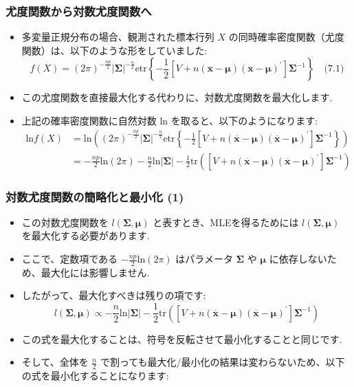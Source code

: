 \documentclass{beamer}
\begin{document}
\begin{frame}
\frametitle{尤度関数から対数尤度関数へ}
\begin{itemize}
    \item 多変量正規分布の場合、観測された標本行列 $X$ の同時確率密度関数（尤度関数）は、以下のような形をしていました:
    \[
    f(X)=(2\pi)^{-\frac{np}{2}}|\bm{\Sigma}|^{-\frac{n}{2}}\text{etr}\left\{-\frac{1}{2}[V+n(\overline{\bm{x}}-\bm{\mu})(\overline{\bm{x}}-\bm{\mu})^{\prime}]\bm{\Sigma}^{-1}\right\} \quad \text{(7.1)} \text{}
    \]
    \item この尤度関数を直接最大化する代わりに、対数尤度関数を最大化します.
    \item 上記の確率密度関数に自然対数 $\text{ln}$ を取ると、以下のようになります:
    \begin{align*}
    \text{ln}f(X)&=\text{ln}\left((2\pi)^{-\frac{np}{2}}|\bm{\Sigma}|^{-\frac{n}{2}}\text{etr}\left\{-\frac{1}{2}[V+n(\overline{\bm{x}}-\bm{\mu})(\overline{\bm{x}}-\bm{\mu})^{\prime}]\bm{\Sigma}^{-1}\right\}\right) \text{} \\
    &=-\frac{np}{2}\text{ln}(2\pi)-\frac{n}{2}\text{ln}|\bm{\Sigma}|-\frac{1}{2}\text{tr}\left([V+n(\overline{\bm{x}}-\bm{\mu})(\overline{\bm{x}}-\bm{\mu})^{\prime}]\bm{\Sigma}^{-1}\right) \text{}
    \end{align*}
\end{itemize}
\end{frame}

\begin{frame}
\frametitle{対数尤度関数の簡略化と最小化 (1)}
\begin{itemize}
    \item この対数尤度関数を $l(\bm{\Sigma},\bm{\mu})$ と表すとき、MLEを得るためには $l(\bm{\Sigma},\bm{\mu})$ を最大化する必要があります.
    \item ここで、定数項である $-\frac{np}{2}\text{ln}(2\pi)$ はパラメータ $\bm{\Sigma}$ や $\bm{\mu}$ に依存しないため、最大化には影響しません.
    \item したがって、最大化すべきは残りの項です:
    \[
    l(\bm{\Sigma},\bm{\mu})\propto-\frac{n}{2}\text{ln}|\bm{\Sigma}|-\frac{1}{2}\text{tr}\left([V+n(\overline{\bm{x}}-\bm{\mu})(\overline{\bm{x}}-\bm{\mu})^{\prime}]\bm{\Sigma}^{-1}\right)
    \]
    \item この式を最大化することは、符号を反転させて最小化することと同じです.
    \item そして、全体を $\frac{n}{2}$ で割っても最大化/最小化の結果は変わらないため、以下の式を最小化することになります:
\end{itemize}
\end{frame}
\end{document}
